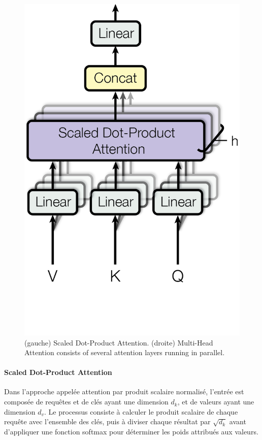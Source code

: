 \begin{figure}
\begin{minipage}[t]{0.5\textwidth}
      \includegraphics[scale=0.7]{gfx/ModalNet-20}  
    \end{minipage}
    
    \caption{(gauche) Scaled Dot-Product Attention. (droite) Multi-Head Attention consists of several attention layers running in parallel. \cite{vaswani2023attention}}
    \label{fig:multi-head-att}
\end{figure}

\paragraph{Scaled Dot-Product Attention} \hspace{0pt}

Dans l'approche appelée attention par produit scalaire normalisé, l'entrée est composée de requêtes et de clés ayant une dimension \(d_k\), et de valeurs ayant une dimension \(d_v\). Le processus consiste à calculer le produit scalaire de chaque requête avec l'ensemble des clés, puis à diviser chaque résultat par \(\sqrt{d_k}\) avant d'appliquer une fonction softmax pour déterminer les poids attribués aux valeurs.


